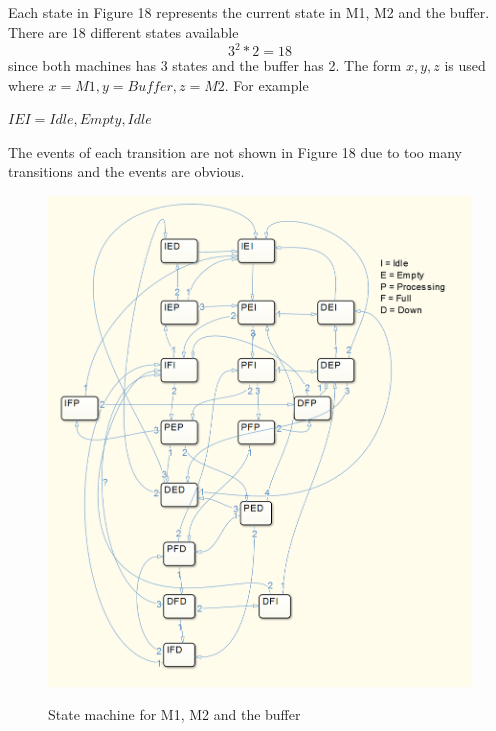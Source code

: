 \documentclass[12pt,a4paper]{article}
\begin{document}
\subsection{}
Each state in Figure 18 represents the current state in M1, M2 and the
buffer. There are 18 different states available 
\begin{equation}
3^2*2 = 18
\end{equation}
since both machines has 3 states and the buffer has 2.
The form ${x,y,z}$ is used where $x=M1,y=Buffer,z=M2$. For example
\begin{center}
$IEI = {Idle,Empty,Idle}$
\end{center}
The events of each transition are not shown in Figure 18 due to too many
transitions and the events are obvious.
\begin{center}
	\begin{figure}[H]
      \centering
	\includegraphics[scale=0.7]{des2.png}
	\label{fig:des1}
	\caption{State machine for M1, M2 and the buffer}
	\end{figure}
\end{center}
\end{document}
